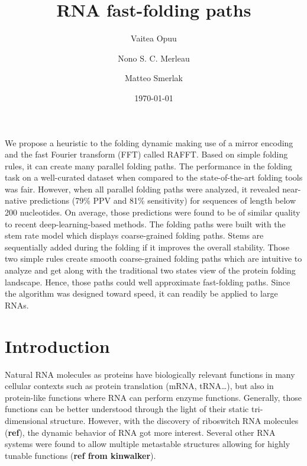 \documentclass[a4paper,12pt]{article}
\author[]{Vaitea Opuu}
\author[]{Nono S. C. Merleau}
\author[]{Matteo Smerlak}
\affil[]{Max Planck Institute for Mathematics in the Sciences, D-04103 Leipzig, Germany}
\date{\today}
\title{RNA fast-folding paths}
\begin{document}
\maketitle
We propose a heuristic to the folding dynamic making use of a mirror encoding
and the fast Fourier transform (FFT) called RAFFT. Based on simple folding
rules, it can create many parallel folding paths. The performance in the folding
task on a well-curated dataset when compared to the state-of-the-art folding
tools was fair. However, when all parallel folding paths were analyzed, it
revealed near-native predictions (79\% PPV and 81\% sensitivity) for sequences of
length below 200 nucleotides. On average, those predictions were found to be of
similar quality to recent deep-learning-based methods. The folding paths were
built with the stem rate model which displays coarse-grained folding paths.
Stems are sequentially added during the folding if it improves the overall
stability. Those two simple rules create smooth coarse-grained folding paths
which are intuitive to analyze and get along with the traditional two states
view of the protein folding landscape. Hence, those paths could well approximate
fast-folding paths. Since the algorithm was designed toward speed, it can
readily be applied to large RNAs.

\section{Introduction}
\label{sec:org694519e}
Natural RNA molecules as proteins have biologically relevant functions in many
cellular contexts such as protein translation (mRNA, tRNA\ldots{}), but also in
protein-like functions where RNA can perform enzyme functions. Generally, those
functions can be better understood through the light of their static
tri-dimensional structure. However, with the discovery of riboswitch RNA
molecules (\textbf{ref}), the dynamic behavior of RNA got more interest. Several other
RNA systems were found to allow multiple metastable structures allowing for
highly tunable functions (\textbf{ref from kinwalker}).
\end{document}
